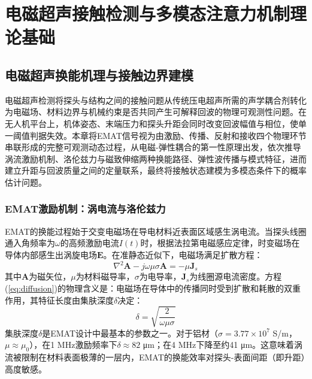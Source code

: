 \chapter{电磁超声接触检测与多模态注意力机制理论基础}

\section{电磁超声换能机理与接触边界建模}

电磁超声检测将探头与结构之间的接触问题从传统压电超声所需的声学耦合剂转化为电磁场、材料边界与机械约束是否共同产生可解释回波的物理可观测性问题。在无人机平台上，机体姿态、末端压力和探头升距会同时改变回波幅值与相位，使单一阈值判据失效。本章将EMAT信号视为由激励、传播、反射和接收四个物理环节串联形成的完整可观测动态过程，从电磁-弹性耦合的第一性原理出发，依次推导涡流激励机制、洛伦兹力与磁致伸缩两种换能路径、弹性波传播与模式特征，进而建立升距与回波质量之间的定量联系，最终将接触状态建模为多模态条件下的概率估计问题。

\subsection{EMAT激励机制：涡电流与洛伦兹力}

EMAT的换能过程始于交变电磁场在导电材料近表面区域感生涡电流。当探头线圈通入角频率为$\omega$的高频激励电流$I(t)$时，根据法拉第电磁感应定律，时变磁场在导体内部感生出涡旋电场$\mathbf{E}$。在准静态近似下\cite{hirao2003emat}，电磁场满足扩散方程：
\begin{equation}
\nabla^2 \mathbf{A} - j\omega\mu\sigma\mathbf{A} = -\mu\mathbf{J}_s
\label{eq:diffusion}
\end{equation}
其中$\mathbf{A}$为磁矢位，$\mu$为材料磁导率，$\sigma$为电导率，$\mathbf{J}_s$为线圈源电流密度。方程(\ref{eq:diffusion})的物理含义是：电磁场在导体中的传播同时受到扩散和耗散的双重作用，其特征长度由集肤深度$\delta$决定：
\begin{equation}
\delta = \sqrt{\frac{2}{\omega\mu\sigma}}
\label{eq:skin_depth}
\end{equation}
集肤深度$\delta$是EMAT设计中最基本的参数之一。对于铝材（$\sigma = 3.77 \times 10^7$ S/m，$\mu \approx \mu_0$），在1 MHz激励频率下$\delta \approx 82$ μm；在4 MHz下降至约41 μm\cite{chen2024novel}。这意味着涡流被限制在材料表面极薄的一层内，EMAT的换能效率对探头-表面间距（即升距）高度敏感。

